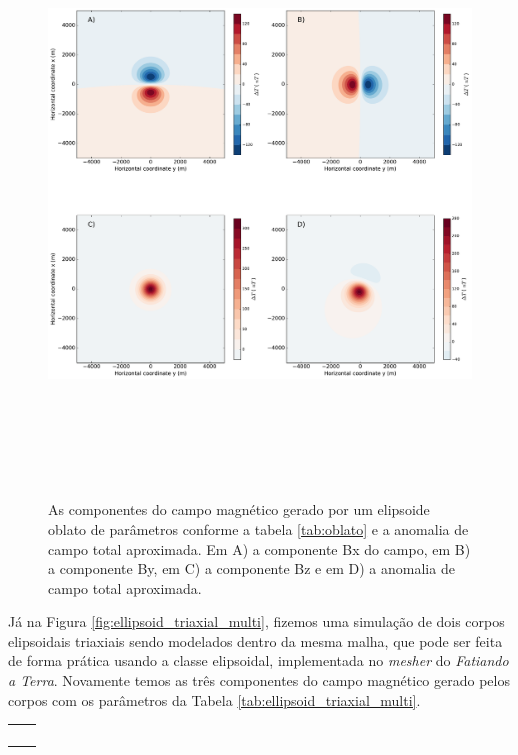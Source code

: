 \begin{figure}[hbt!]
	\centering \includegraphics[width=16cm,height=16cm]{figures/ellipsoid_oblate}
	\caption[As componentes do campo magnético gerado por um elipsoide oblato e a anomalia de campo total aproximada.]{As componentes 
		do campo magnético gerado por um elipsoide oblato de parâmetros conforme a tabela \ref{tab:oblato} e a anomalia de campo total aproximada. Em A) a componente Bx do campo, em B) a componente By, em C) a componente Bz e em D) a anomalia de campo total aproximada.}
	\label{fig:oblate}
\end{figure}

Já na Figura \ref{fig:ellipsoid_triaxial_multi}, fizemos uma simulação de dois corpos elipsoidais triaxiais sendo modelados dentro da mesma malha, que pode ser feita de forma prática usando a classe elipsoidal, implementada no \textit{mesher} do \textit{Fatiando a Terra}. Novamente temos as três componentes do campo magnético gerado pelos corpos com os parâmetros da Tabela \ref{tab:ellipsoid_triaxial_multi}.

\begin{table}[h!]
	\begin{center}
		\begin{tabular}{lc}
			
			&  \\
			&  \\
			&  \\
			&  \\
		\end{tabular}
	\end{center}
\end{table}

